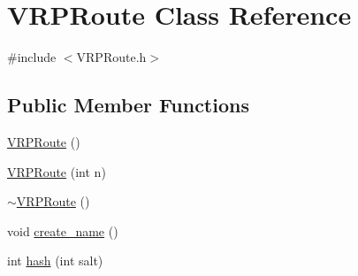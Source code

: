 \hypertarget{class_v_r_p_route}{
\section{VRPRoute Class Reference}
\label{class_v_r_p_route}
}


{\ttfamily \#include $<$VRPRoute.h$>$}

\subsection*{Public Member Functions}
\begin{DoxyCompactItemize}
\item 
\hyperlink{class_v_r_p_route_aab37c41341c52ddb11e7a5fb185de137}{VRPRoute} ()
\item 
\hyperlink{class_v_r_p_route_a4aef4ce735851f4254085e789ffe534d}{VRPRoute} (int n)
\item 
\hyperlink{class_v_r_p_route_ad0628e5642eda49b5206f3b66d98abf6}{$\sim$VRPRoute} ()
\item 
void \hyperlink{class_v_r_p_route_a1fc3727d2067d9926ece08f7a184d024}{create\_\-name} ()
\item 
int \hyperlink{class_v_r_p_route_a60d9e2db1eed4216f1390dd96822d484}{hash} (int salt)
\end{DoxyCompactItemize}
